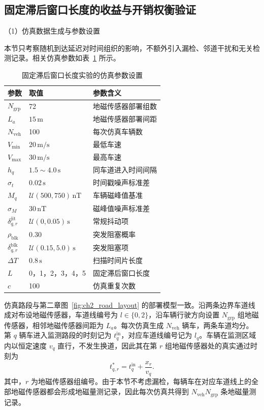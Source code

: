 \documentclass{xdupgthesis}
\begin{document}
\subsection{固定滞后窗口长度的收益与开销权衡验证}

\noindent （1）仿真数据生成与参数设置

本节只考察随机到达延迟对时间组织的影响，不额外引入漏检、邻道干扰和无关检测记录。相关仿真参数如表~\ref{tab:ch3_lag_window_sim} 所示。

\begin{table}[H]
	\centering
	\caption{固定滞后窗口长度实验的仿真参数设置}
	\label{tab:ch3_lag_window_sim}
	\small
	\begin{tabular}{p{2.8cm}p{3.0cm}p{6.0cm}}
		\toprule
		参数 & 取值 & 参数含义 \\
		\midrule
		$N_{\mathrm{grp}}$ & 72 & 地磁传感器部署组数 \\
		$L_a$ & $15\,\mathrm{m}$ & 地磁传感器部署间距 \\
		$N_{\mathrm{veh}}$ & 100 & 每次仿真车辆数 \\
		$V_{\min}$ & $20\,\mathrm{m/s}$ & 最低车速 \\
		$V_{\max}$ & $30\,\mathrm{m/s}$ & 最高车速 \\
		$h_q$ & $1.5\sim4.0\,\mathrm{s}$ & 同车道进入时间间隔 \\
		$\sigma_t$ & $0.02\,\mathrm{s}$ & 时间戳噪声标准差 \\
		$M_q$ & $\mathcal U(500,750)\,\mathrm{nT}$ & 车辆磁峰值基准 \\
		$\sigma_M$ & $30\,\mathrm{nT}$ & 磁峰值噪声标准差 \\
		$\delta_{q,r}^{\mathrm{jit}}$ & $\mathcal U(0,0.05)\,\mathrm{s}$ & 常规抖动项 \\
		$\rho_{\mathrm{blk}}$ & 0.30 & 突发阻塞概率 \\
		$\delta_{q,r}^{\mathrm{blk}}$ & $\mathcal U(0.15,5.0)\,\mathrm{s}$ & 突发阻塞项 \\
		$\Delta T$ & $0.8\,\mathrm{s}$ & 扫描时间片长度 \\
		$L$ & 0，1，2，3，4，5 & 固定滞后窗口长度 \\
		$c$ & 100 & 仿真重复次数 \\
		\bottomrule
	\end{tabular}
\end{table}

仿真路段与第二章图~\ref{fig:ch2_road_layout} 的部署模型一致。沿两条边界车道线成对布设地磁传感器，车道线编号为 $l\in\{0,2\}$，沿车辆行驶方向设置 $N_{\mathrm{grp}}$ 组地磁传感器，相邻地磁传感器间距为 $L_a$。每次仿真生成 $N_{\mathrm{veh}}$ 辆车，两条车道均分。第 $q$ 辆车进入监测路段的时刻记为 $t_q^{\mathrm{in}}$，对应车道线编号记为 $l_q$。车辆在监测区域内以恒定速度 $v_q$ 直行，不发生换道，因此其在第 $r$ 组地磁传感器处的真实通过时刻为
\begin{equation}
	t_{q,r}^{\ast}
	=
	t_q^{\mathrm{in}}+\frac{x_r}{v_q}.
\end{equation}
其中，$r$ 为地磁传感器组编号。由于本节不考虑漏检，每辆车在对应车道线上的全部地磁传感器都会形成地磁量测记录，因此每次仿真共得到 $N_{\mathrm{veh}}N_{\mathrm{grp}}$ 条地磁量测记录。
\end{document}
